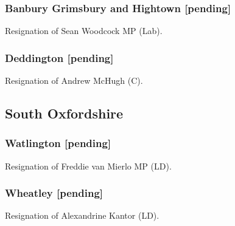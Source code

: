 \documentclass[a4paper,openany]{book}
\begin{document}
\begin{resultsiii}
\subsubsection*{Banbury Grimsbury and Hightown \hspace*{\fill}\nolinebreak[1]%
	\enspace\hspace*{\fill}
	[pending]}


Resignation of Sean Woodcock MP (Lab).

\subsubsection*{Deddington \hspace*{\fill}\nolinebreak[1]%
	\enspace\hspace*{\fill}
	[pending]}


Resignation of Andrew McHugh (C).

\subsection*{South Oxfordshire}

\subsubsection*{Watlington \hspace*{\fill}\nolinebreak[1]%
	\enspace\hspace*{\fill}
	[pending]}


Resignation of Freddie van Mierlo MP (LD).

\subsubsection*{Wheatley \hspace*{\fill}\nolinebreak[1]%
	\enspace\hspace*{\fill}
	[pending]}


Resignation of Alexandrine Kantor (LD).


\end{resultsiii}
\end{document}
